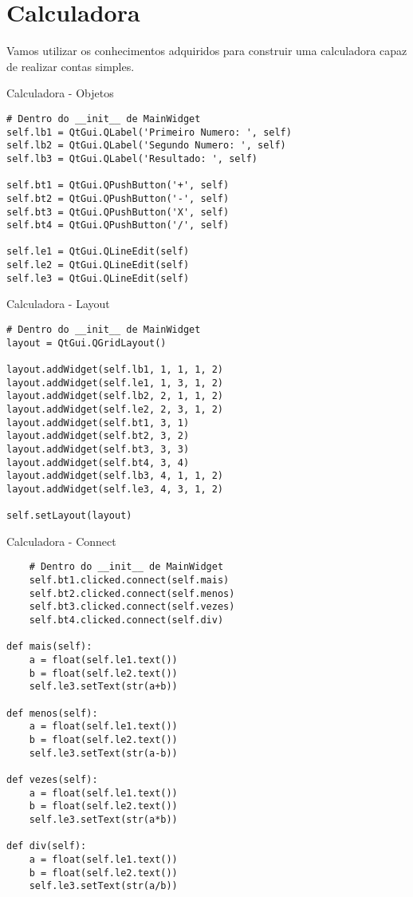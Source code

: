 \documentclass[presentation]{beamer}
\begin{document}
\section{Calculadora}
\label{sec:orgheadline17}
Vamos utilizar os conhecimentos adquiridos para construir uma calculadora capaz de realizar contas simples.
\begin{frame}[fragile,label={sec:orgheadline14}]{Calculadora - Objetos}
 \begin{verbatim}
# Dentro do __init__ de MainWidget
self.lb1 = QtGui.QLabel('Primeiro Numero: ', self)
self.lb2 = QtGui.QLabel('Segundo Numero: ', self)
self.lb3 = QtGui.QLabel('Resultado: ', self)
        
self.bt1 = QtGui.QPushButton('+', self)
self.bt2 = QtGui.QPushButton('-', self)
self.bt3 = QtGui.QPushButton('X', self)
self.bt4 = QtGui.QPushButton('/', self)
        
self.le1 = QtGui.QLineEdit(self)
self.le2 = QtGui.QLineEdit(self)
self.le3 = QtGui.QLineEdit(self)
\end{verbatim}
\end{frame}
\begin{frame}[fragile,label={sec:orgheadline15}]{Calculadora - Layout}
 \begin{verbatim}
# Dentro do __init__ de MainWidget
layout = QtGui.QGridLayout()
        
layout.addWidget(self.lb1, 1, 1, 1, 2)
layout.addWidget(self.le1, 1, 3, 1, 2)
layout.addWidget(self.lb2, 2, 1, 1, 2)
layout.addWidget(self.le2, 2, 3, 1, 2)
layout.addWidget(self.bt1, 3, 1)
layout.addWidget(self.bt2, 3, 2)
layout.addWidget(self.bt3, 3, 3)
layout.addWidget(self.bt4, 3, 4)
layout.addWidget(self.lb3, 4, 1, 1, 2)
layout.addWidget(self.le3, 4, 3, 1, 2)
        
self.setLayout(layout)
\end{verbatim}
\end{frame}
\begin{frame}[fragile,label={sec:orgheadline16}]{Calculadora - Connect}
 \begin{verbatim}
    # Dentro do __init__ de MainWidget
    self.bt1.clicked.connect(self.mais)
    self.bt2.clicked.connect(self.menos)
    self.bt3.clicked.connect(self.vezes)
    self.bt4.clicked.connect(self.div)

def mais(self):
    a = float(self.le1.text())
    b = float(self.le2.text())
    self.le3.setText(str(a+b))

def menos(self):
    a = float(self.le1.text())
    b = float(self.le2.text())
    self.le3.setText(str(a-b))

def vezes(self):
    a = float(self.le1.text())
    b = float(self.le2.text())
    self.le3.setText(str(a*b))

def div(self):
    a = float(self.le1.text())
    b = float(self.le2.text())
    self.le3.setText(str(a/b))
\end{verbatim}
\end{frame}
\end{document}
